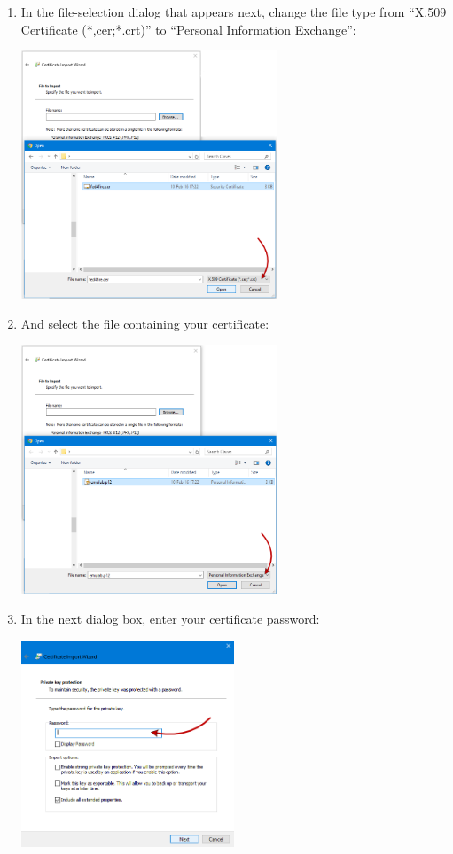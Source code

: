 \documentclass[a4paper,10pt]{article}
\begin{document}
\begin{enumerate}
	\item In the file-selection dialog that appears next, change the file type from ``X.509 Certificate (*,cer;*.crt)'' to ``Personal Information Exchange'':\\
	\begin{center}\includegraphics[width=0.6\textwidth]{InstallCert06.png}\end{center}
	
	\item And select the file containing your certificate:\\
	\begin{center}\includegraphics[width=0.6\textwidth]{InstallCert07.png}\end{center}
	
	\item In the next dialog box, enter your certificate password:\\
	\begin{center}\centering\includegraphics[width=0.5\textwidth]{InstallCert08.png}\end{center}
	

\end{enumerate}
\end{document}
